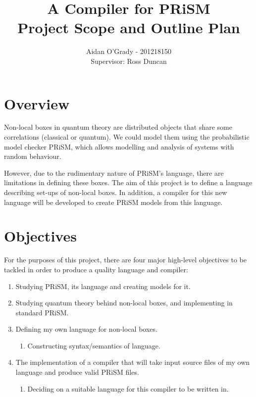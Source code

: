 \documentclass[11pt, a4paper]{article}
\begin{document}
\title{A Compiler for PRiSM \\
\large{Project Scope and Outline Plan}}
\author{Aidan O'Grady - 201218150\\Supervisor: Ross Duncan}
\date{}
\maketitle

\section{Overview} %
\label{sec:overview}
Non-local boxes in quantum theory are distributed objects that share some
correlations (classical or quantum). We could model them using the probabilistic
model checker PRiSM, which allows modelling and analysis of systems with random
behaviour.

However, due to the rudimentary nature of PRiSM's language, there are
limitations in defining these boxes. The aim of this project is to define a
language describing set-ups of non-local boxes. In addition, a compiler for this
new language will be developed to create PRiSM models from this language.


\section{Objectives} %
\label{sec:objectives}
For the purposes of this project, there are four major high-level objectives to
be tackled in order to produce a quality language and compiler:
\begin{enumerate}
    \item Studying PRiSM, its language and creating models for it.
    \item Studying quantum theory behind non-local boxes, and implementing
    in standard PRiSM.
    \item Defining my own language for non-local boxes.
    \begin{enumerate}
        \item Constructing syntax/semantics of language.
    \end{enumerate}
    \item The implementation of a compiler that will take input source files of
    my own language and produce valid PRiSM files.
    \begin{enumerate}
        \item Deciding on a suitable language for this compiler to be written
        in.
    \end{enumerate}
\end{enumerate}
\end{document}
